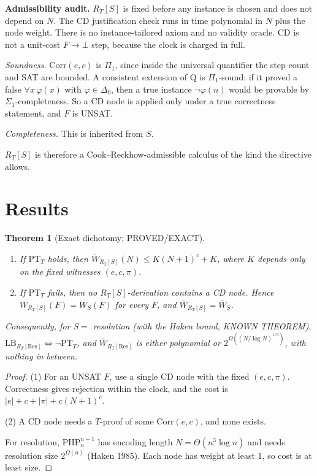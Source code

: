 \documentclass[11pt]{article}
\newtheorem{theorem}{Theorem}
\newcommand{\Wb}{\overline W}
\newcommand{\Corr}{\mathrm{Corr}}
\newcommand{\PT}{\mathrm{PT}}
\begin{document}
\textbf{Admissibility audit.} $R_T[S]$ is fixed before any instance is chosen and does not
depend on $N$. The CD justification check runs in time polynomial in $N$ plus the node weight.
There is no instance-tailored axiom and no validity oracle. CD is not a unit-cost
$F\to\bot$ step, because the clock is charged in full.

\emph{Soundness.} $\Corr(e,c)$ is $\Pi_1$, since inside the universal quantifier the step
count and SAT are bounded. A consistent extension of $\mathrm Q$ is $\Pi_1$-sound: if it
proved a false $\forall x\,\varphi(x)$ with $\varphi\in\Delta_0$, then a true instance
$\neg\varphi(n)$ would be provable by $\Sigma_1$-completeness. So a CD node is applied only
under a true correctness statement, and $F$ is UNSAT.

\emph{Completeness.} This is inherited from $S$.

$R_T[S]$ is therefore a Cook--Reckhow-admissible calculus of the kind the directive allows.

\section{Results}
\begin{theorem}[Exact dichotomy; PROVED/EXACT]\label{thm:dich}
\begin{enumerate}
\item If $\PT_T$ holds, then $\Wb_{R_T[S]}(N)\le K(N+1)^{c}+K$, where $K$ depends only on the fixed witnesses $(e,c,\pi)$.
\item If $\PT_T$ fails, then no $R_T[S]$-derivation contains a CD node. Hence $W_{R_T[S]}(F)=W_S(F)$ for every $F$, and $\Wb_{R_T[S]}=\Wb_S$.
\end{enumerate}
Consequently, for $S=$ resolution (with the Haken bound, KNOWN THEOREM),
$\mathrm{LB}_{R_T[\mathrm{Res}]}\iff\neg\PT_T$, and $\Wb_{R_T[\mathrm{Res}]}$ is either
polynomial or $2^{\Omega((N/\log N)^{1/3})}$, with nothing in between.
\end{theorem}
\begin{proof}
(1) For an UNSAT $F$, use a single CD node with the fixed $(e,c,\pi)$. Correctness gives
rejection within the clock, and the cost is $|e|+c+|\pi|+c(N+1)^c$.

(2) A CD node needs a $T$-proof of some $\Corr(e,c)$, and none exists.

For resolution, $\mathrm{PHP}^{n+1}_n$ has encoding length $N=\Theta(n^3\log n)$ and needs
resolution size $2^{\Omega(n)}$ (Haken 1985). Each node has weight at least $1$, so cost is
at least size.
\end{proof}
\end{document}
